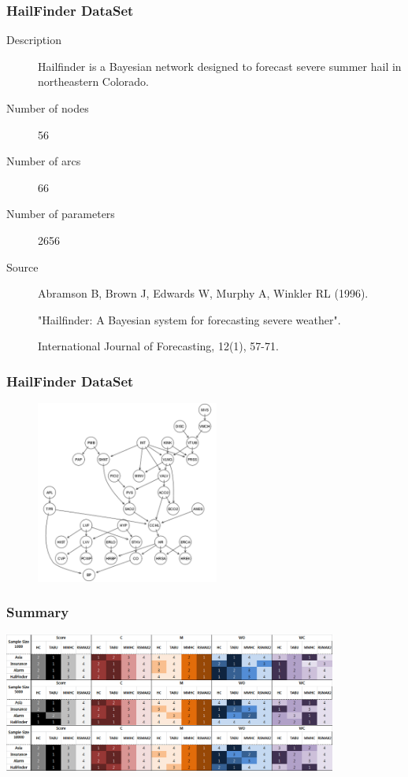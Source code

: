 \documentclass{beamer}
\begin{document}
\begin{frame}
\frametitle{HailFinder DataSet}
{\scriptsize{}
\begin{description}
	\item[Description] Hailfinder is a Bayesian network designed to forecast severe summer hail in northeastern Colorado.
	
	\item[Number of nodes] 56
	
	\item[Number of arcs] 66
	
	\item[Number of parameters] 2656
	
	\item[Source]  Abramson B, Brown J, Edwards W, Murphy A, Winkler RL (1996).
	
	"Hailfinder: A Bayesian system for forecasting severe weather".
	
	International Journal of Forecasting, 12(1), 57-71.
\end{description}
}
\end{frame}


\begin{frame}
\frametitle{HailFinder DataSet}
{\scriptsize{}
	\begin{figure}
		\includegraphics[height=170pt]{images/Model_Real_Hailfinder}
	\end{figure}	
}
\end{frame}



\begin{frame}
\frametitle{Summary}
{\scriptsize{}
	\begin{center}
		\includegraphics[height=130pt]{images/Real_Result}
	\end{center}
}
\end{frame}
\end{document}
